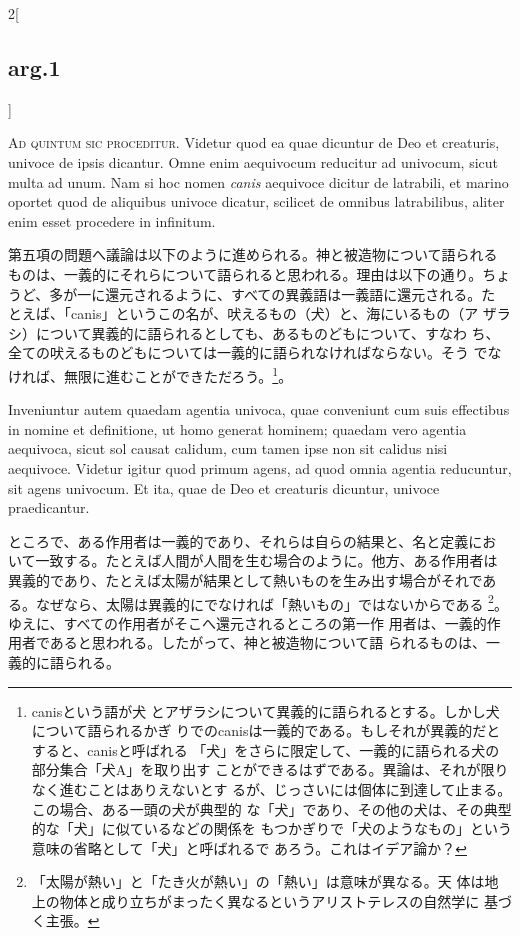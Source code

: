 \documentclass[paper=a4paper,fontsize=10pt,jafontsize=9pt,titlepage]{jlreq}
\begin{document}
{}
\setcounter{section}{5}
\setcounter{subsection}{0}

\begin{paracol}{2}[\subsection{arg.1}]

{\scshape Ad quintum sic proceditur}. Videtur quod ea quae dicuntur de Deo
et creaturis, univoce de ipsis dicantur. Omne enim aequivocum
reducitur ad univocum, sicut multa ad unum. Nam si hoc nomen {\itshape
canis} aequivoce dicitur de latrabili,
et marino
oportet quod de aliquibus univoce dicatur, scilicet de omnibus
latrabilibus, aliter enim esset procedere in infinitum.

\switchcolumn

第五項の問題へ議論は以下のように進められる。神と被造物について語られる
ものは、一義的にそれらについて語られると思われる。理由は以下の通り。ちょ
うど、多が一に還元されるように、すべての異義語は一義語に還元される。た
とえば、「canis」というこの名が、吠えるもの（犬）と、海にいるもの（ア
ザラシ）について異義的に語られるとしても、あるものどもについて、すなわ
ち、全ての吠えるものどもについては一義的に語られなければならない。そう
でなければ、無限に進むことができただろう。\footnote{canisという語が犬
とアザラシについて異義的に語られるとする。しかし犬について語られるかぎ
りでのcanisは一義的である。もしそれが異義的だとすると、canisと呼ばれる
「犬」をさらに限定して、一義的に語られる犬の部分集合「犬A」を取り出す
ことができるはずである。異論は、それが限りなく進むことはありえないとす
るが、じっさいには個体に到達して止まる。この場合、ある一頭の犬が典型的
な「犬」であり、その他の犬は、その典型的な「犬」に似ているなどの関係を
もつかぎりで「犬のようなもの」という意味の省略として「犬」と呼ばれるで
あろう。これはイデア論か？}。

\switchcolumn*

Inveniuntur autem quaedam agentia univoca, quae conveniunt cum suis
effectibus in nomine et definitione, ut homo generat hominem; quaedam
vero agentia aequivoca, sicut sol causat calidum, cum tamen ipse non
sit calidus nisi aequivoce. Videtur igitur quod primum agens, ad quod
omnia agentia reducuntur, sit agens univocum. Et ita, quae de Deo et
creaturis dicuntur, univoce praedicantur.

\switchcolumn

ところで、ある作用者は一義的であり、それらは自らの結果と、名と定義にお
いて一致する。たとえば人間が人間を生む場合のように。他方、ある作用者は
異義的であり、たとえば太陽が結果として熱いものを生み出す場合がそれであ
る。なぜなら、太陽は異義的にでなければ「熱いもの」ではないからである
\footnote{「太陽が熱い」と「たき火が熱い」の「熱い」は意味が異なる。天
体は地上の物体と成り立ちがまったく異なるというアリストテレスの自然学に
基づく主張。}。ゆえに、すべての作用者がそこへ還元されるところの第一作
用者は、一義的作用者であると思われる。したがって、神と被造物について語
られるものは、一義的に語られる。


\end{paracol}
\end{document}
